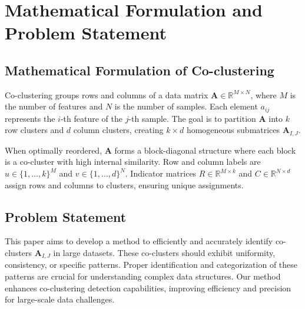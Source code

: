 \documentclass[letterpaper, 10 pt, conference]{ieeeconf}  %
\begin{document}

\section{Mathematical Formulation and Problem Statement}\label{sec:formula}

\subsection{Mathematical Formulation of Co-clustering}
Co-clustering groups rows and columns of a data matrix $\mathbf{A} \in \mathbb{R}^{M \times N}$, where $M$ is the number of features and $N$ is the number of samples. Each element $a_{ij}$ represents the $i$-th feature of the $j$-th sample. The goal is to partition $\mathbf{A}$ into $k$ row clusters and $d$ column clusters, creating $k \times d$ homogeneous submatrices $\mathbf{A}_{I, J}$.

When optimally reordered, $\mathbf{A}$ forms a block-diagonal structure where each block is a co-cluster with high internal similarity. Row and column labels are \( u \in \{1,\dots,k\}^M \) and \( v \in \{1,\dots,d\}^N \). Indicator matrices \( R \in \mathbb{R}^{M \times k} \) and \( C \in \mathbb{R}^{N \times d} \) assign rows and columns to clusters, ensuring unique assignments.

\subsection{Problem Statement}
This paper aims to develop a method to efficiently and accurately identify co-clusters $\mathbf{A}_{I, J}$ in large datasets. These co-clusters should exhibit uniformity, consistency, or specific patterns. Proper identification and categorization of these patterns are crucial for understanding complex data structures. Our method enhances co-clustering detection capabilities, improving efficiency and precision for large-scale data challenges.
\end{document}
